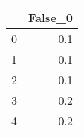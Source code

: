 \begin{tabular}{lr}
\toprule
{} &  False\_0 \\ \hline
\midrule
0 &      0.1 \\ \hline
1 &      0.1 \\ \hline
2 &      0.1 \\ \hline
3 &      0.2 \\ \hline
4 &      0.2 \\ \hline
\bottomrule
\end{tabular}
